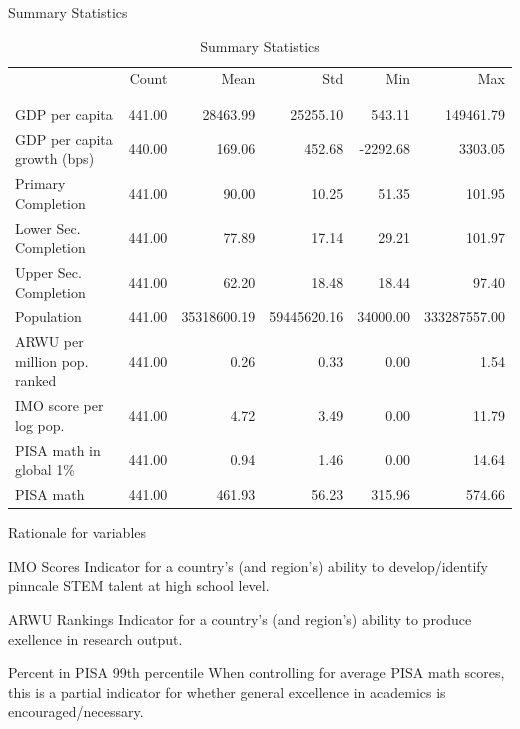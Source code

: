 \documentclass[10pt]{beamer}
\begin{document}
\begin{frame}{Summary Statistics}
    \begin{table}
        \caption{Summary Statistics}
        \resizebox{\linewidth}{!} {
            \begin{tabular}{lrrrrr}
            & Count & Mean & Std & Min & Max \\
            \\[-1.8ex]\hline
            \hline \\[-1.8ex]
            GDP per capita & 441.00 & 28463.99 & 25255.10 & 543.11 & 149461.79 \\
            GDP per capita growth (bps) & 440.00 & 169.06 & 452.68 & -2292.68 & 3303.05 \\
            Primary Completion & 441.00 & 90.00 & 10.25 & 51.35 & 101.95 \\
            Lower Sec. Completion & 441.00 & 77.89 & 17.14 & 29.21 & 101.97 \\
            Upper Sec. Completion & 441.00 & 62.20 & 18.48 & 18.44 & 97.40 \\
            Population & 441.00 & 35318600.19 & 59445620.16 & 34000.00 & 333287557.00 \\
            ARWU per million pop. ranked & 441.00 & 0.26 & 0.33 & 0.00 & 1.54 \\
            IMO score per log pop. & 441.00 & 4.72 & 3.49 & 0.00 & 11.79 \\
            PISA math in global 1\% & 441.00 & 0.94 & 1.46 & 0.00 & 14.64 \\
            PISA math & 441.00 & 461.93 & 56.23 & 315.96 & 574.66 \\
            \end{tabular}
        }
    \end{table}
\end{frame}

\begin{frame}{Rationale for variables}
    \begin{block}{IMO Scores}
        Indicator for a country's (and region's) ability to develop/identify pinncale STEM talent at high school level.
    \end{block}

    \begin{block}{ARWU Rankings}
        Indicator for a country's (and region's) ability to produce exellence in research output.
    \end{block}

    \begin{block}{Percent in PISA 99th percentile}
        When controlling for average PISA math scores, this is a partial indicator for whether general excellence in academics is encouraged/necessary.
    \end{block}
\end{frame}
\end{document}
